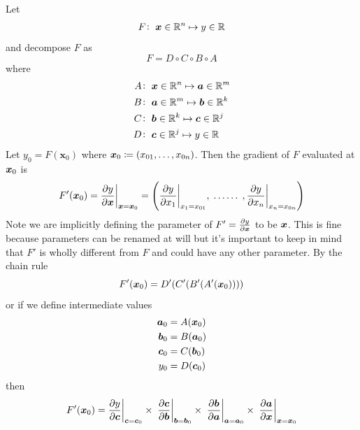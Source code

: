 Let
%
\begin{align*}
    F\colon\; \bm{x} \in \mathbb{R}^n \mapsto y \in \mathbb{R}
\end{align*}
%
and decompose \(F\) as
\begin{equation*}
    F = D \circ C \circ B \circ A
\end{equation*}
%
where
%
\begin{align*}
    A & \colon\; \bm{x} \in \mathbb{R}^n \mapsto  \bm{a} \in \mathbb{R}^m    \\
    B & \colon\; \bm{a} \in \mathbb{R}^m \mapsto  \bm{b} \in \mathbb{R}^k \\
    C & \colon\; \bm{b} \in \mathbb{R}^k \mapsto  \bm{c} \in \mathbb{R}^j \\
    D & \colon\; \bm{c} \in \mathbb{R}^j \mapsto  y \in \mathbb{R}
\end{align*}
%
Let \(y_0 = F(\bm{x}_0)\) where \(\bm{x}_0 \coloneqq \left( x_{01}, \dots, x_{0n}\right)\).
%
Then the gradient of \(F\) evaluated at \(\bm{x}_0\) is
\begin{equation*}
    F'(\bm{x}_0) = \evalat[\bigg]{\pdv{y}{\bm{x}}}{\bx = \bx_0}
    = \left(
    \evalat[\bigg]{\pdv{y}{x_1}}{x_1 = x_{01}},
    \;\dots\dots\;,
    \evalat[\bigg]{\pdv{y}{x_n}}{x_n = x_{0n}}
    \right)
\end{equation*}
%
Note we are implicitly defining the parameter of \(F' = \pdv{y}{\bm{x}}\) to be \(\bm{x}\).
%
This is fine because parameters can be renamed at will but it's important to keep in mind that \(F'\) is wholly different from \(F\) and could have any other parameter.
%
By the chain rule
\begin{equation*}
    F'(\bm{x}_0) =  D'(C'(B'(A'(\bm{x}_0))))
\end{equation*}
%
or if we define intermediate values
%
\begin{align*}
    \bm{a}_0 & = A(\bm{x}_0)    \\
    \bm{b}_0 & = B(\bm{a}_0) \\
    \bm{c}_0 & = C(\bm{b}_0) \\
    y_0      & = D(\bm{c}_0)
\end{align*}
%
then
%
\begin{equation}
    F'(\bm{x}_0) =  \evalat[\bigg]{\pdv{y}{\bm{c}}}{\bm{c}=\bm{c}_0} \times\;
    \evalat[\bigg]{\pdv{\bm{c}}{\bm{b}}}{\bm{b}=\bm{b}_0} \times\;
    \evalat[\bigg]{\pdv{\bm{b}}{\bm{a}}}{\bm{a}=\bm{a}_0} \times\;
    \evalat[\bigg]{\pdv{\bm{a}}{\bm{x}}}{\bx=\bx_0} \label{eqn:chainruleproduct}
\end{equation}
